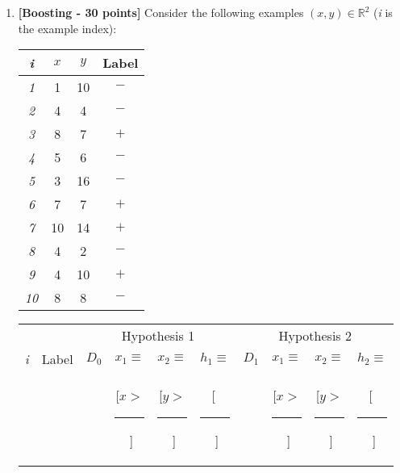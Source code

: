 \begin{enumerate}
\item {\bf [Boosting - 30 points]}
  Consider the following examples $(x,y) \in \mathbb{R}^2$ ({\em i} is the example index):
  \begin{center}
    \begin{tabular}{|c|c|c|c|}
      \hline
      {\em i}  & $x$  & $y$ & Label \\
      \hline
      {\em 1}  & 1  & 10 & $-$ \\
      \hline
      {\em 2}  & 4  & 4 & $-$ \\
      \hline
      {\em 3}  & 8  & 7 & $+$ \\
      \hline
      {\em 4}  & 5  & 6 & $-$ \\
      \hline
      {\em 5}  & 3  & 16 & $-$ \\
      \hline
      {\em 6}  & 7  & 7 & $+$ \\
      \hline
      {\em 7}  & 10 & 14 & $+$ \\
      \hline
      {\em 8}  & 4  & 2 & $-$ \\
      \hline
      {\em 9}  & 4  & 10 & $+$ \\
      \hline
      {\em 10} & 8  & 8 & $-$ \\
      \hline
    \end{tabular}
  \end{center}

    \begin{table}[!t]
      {\centering
        \begin{tabular}{|c|c||c|c|c|c||c|c|c|c|}

          \hline
          & & \multicolumn{4}{c||}{Hypothesis 1}
	  & \multicolumn{4}{c|}{Hypothesis 2} \\
          \cline{3-10}
          {\em i} & Label & $D_0$ & $x_1 \equiv $ & $x_2 \equiv $ & $h_1\equiv$ & $D_1$ &  $x_1 \equiv $ & $x_2 \equiv $ & $h_2 \equiv $ \\
          & & & [$x >$\rule[-2pt]{3mm}{0.2pt}$\;$] & [$y >$\rule[-2pt]{3mm}{0.2pt}$\;$] & [$\;$\rule[-2pt]{1cm}{0.2pt}$\;$] & & [$x >$\rule[-2pt]{3mm}{0.2pt}$\;$] & [$y >$\rule[-2pt]{3mm}{0.2pt}$\;$] & [$\;$\rule[-2pt]{1cm}{0.2pt}$\;$] \\


\end{tabular}}
\end{table}
\end{enumerate}
